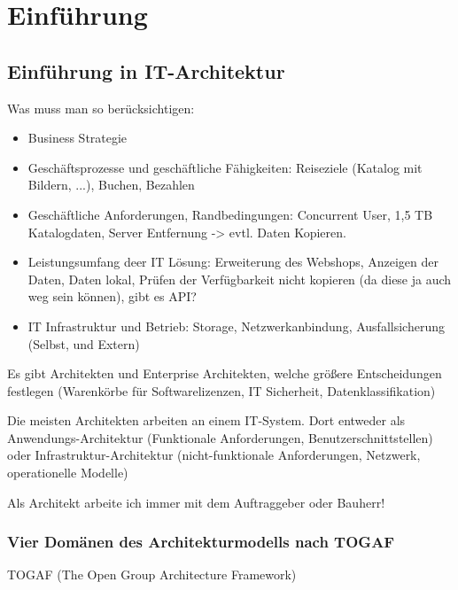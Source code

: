\documentclass[a4paper]{article}
\begin{document}
\section{Einführung}

\subsection{Einführung in IT-Architektur}

Was muss man so berücksichtigen:

\begin{itemize}
    \item Business Strategie
    \item Geschäftsprozesse und geschäftliche Fähigkeiten: Reiseziele (Katalog mit Bildern, ...), Buchen, Bezahlen
    \item Geschäftliche Anforderungen, Randbedingungen: Concurrent User, 1,5 TB Katalogdaten, Server Entfernung -> evtl. Daten Kopieren.
    \item Leistungsumfang deer IT Lösung: Erweiterung des Webshops, Anzeigen der Daten, Daten lokal, Prüfen der Verfügbarkeit nicht kopieren (da diese ja auch weg sein können), gibt es API?
    \item IT Infrastruktur und Betrieb: Storage, Netzwerkanbindung, Ausfallsicherung (Selbst, und Extern)
\end{itemize}

Es gibt Architekten und Enterprise Architekten, welche größere Entscheidungen festlegen (Warenkörbe für Softwarelizenzen, IT Sicherheit, Datenklassifikation)

Die meisten Architekten arbeiten an einem IT-System. Dort entweder als Anwendungs-Architektur (Funktionale Anforderungen, Benutzerschnittstellen) oder Infrastruktur-Architektur (nicht-funktionale Anforderungen, Netzwerk, operationelle Modelle)


Als Architekt arbeite ich immer mit dem Auftraggeber oder Bauherr!

\subsubsection{Vier Domänen des Architekturmodells nach TOGAF}

TOGAF (The Open Group Architecture Framework)
\end{document}
